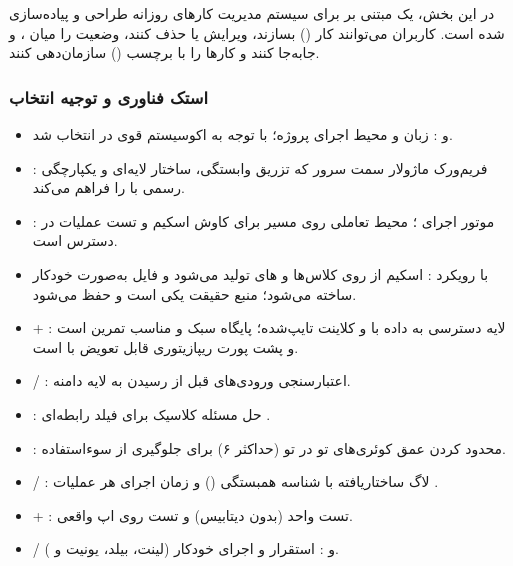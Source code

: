 در این بخش، یک  مبتنی بر  برای سیستم مدیریت کارهای روزانه طراحی و پیاده‌سازی شده است. کاربران می‌توانند کار () بسازند، ویرایش یا حذف کنند، وضعیت را میان ،  و  جابه‌جا کنند و کارها را با برچسب () سازمان‌دهی کنند.

\subsubsection*{ استک فناوری و توجیه انتخاب}

\begin{itemize}
    \item { و :} زبان و محیط اجرای پروژه؛ با توجه به اکوسیستم قوی  در  انتخاب شد.
    \item {:} فریم‌ورک ماژولار سمت سرور که تزریق وابستگی، ساختار لایه‌ای و یکپارچگی رسمی با  را فراهم می‌کند.
    \item {:} موتور اجرای ؛ محیط تعاملی  روی مسیر  برای کاوش اسکیم و تست عملیات در دسترس است.
    \item { با رویکرد :} اسکیم از روی کلاس‌ها و های  تولید می‌شود و فایل  به‌صورت خودکار ساخته می‌شود؛ منبع حقیقت یکی است و  حفظ می‌شود.
    \item { + :} لایه دسترسی به داده با  و کلاینت تایپ‌شده؛  پایگاه سبک و مناسب تمرین است و پشت پورت ریپازیتوری قابل تعویض با  است.
    \item { / :} اعتبارسنجی ورودی‌های  قبل از رسیدن به لایه دامنه.
    \item {:} حل مسئله کلاسیک  برای فیلد رابطه‌ای .
    \item {:} محدود کردن عمق کوئری‌های تو در تو (حداکثر ۶) برای جلوگیری از سوءاستفاده.
    \item { / :} لاگ ساختاریافته با شناسه همبستگی () و زمان اجرای هر عملیات .
    \item { + :} تست واحد (بدون دیتابیس) و تست  روی اپ واقعی.
    \item { /  و :} استقرار و اجرای خودکار  (لینت، بیلد، یونیت و ).
\end{itemize}

